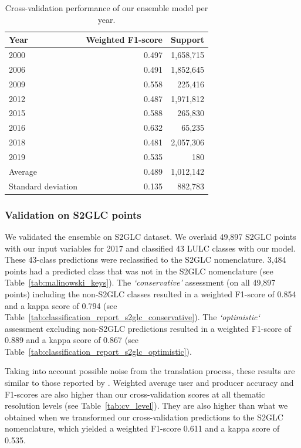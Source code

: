         \begin{table}[!hbt]
        \centering
        \caption{Cross-validation performance of our ensemble model per year.}
        \label{tab:cv_annual}
        \begin{tabular}{lrr}
        \toprule
        Year &  Weighted F1-score &  Support \\
        \midrule
        2000 &              0.497 &  1,658,715 \\
        2006 &              0.491 &  1,852,645 \\
        2009 &              0.558 &   225,416 \\
        2012 &              0.487 &  1,971,812 \\
        2015 &              0.588 &   265,830 \\
        2016 &              0.632 &    65,235 \\
        2018 &              0.481 &  2,057,306 \\
        2019 &              0.535 &      180 \\
        \midrule
        Average &              0.489 &  1,012,142 \\
        Standard deviation &              0.135 &   882,783 \\
        \bottomrule
        \end{tabular}
        \end{table}
    
        
    \subsubsection*{Validation on S2GLC points}
        \label{sec:results-s2glc}
        We validated the ensemble on S2GLC dataset.
        We overlaid 49,897 S2GLC points with our input variables for 2017 and classified 43 LULC classes with our model. These 43-class predictions were reclassified to the S2GLC nomenclature. 3,484 points had a predicted class that was not in the S2GLC nomenclature (see Table\@~\ref{tab:malinowski_keys}). The \emph{`conservative'} assessment (on all 49,897 points) including the non-S2GLC classes resulted in a weighted F1-score of 0.854 and a kappa score of 0.794 (see Table\@~\ref{tab:classification_report_s2glc_conservative}). The \emph{`optimistic`} assessment excluding non-S2GLC predictions resulted in a weighted F1-score of 0.889 and a kappa score of 0.867 (see Table\@~\ref{tab:classification_report_s2glc_optimistic}). 

        Taking into account possible noise from the translation process, these results are similar to those reported by \citet{malinowski2020}. Weighted average user and producer accuracy and F1-scores are also higher than our cross-validation scores at all thematic resolution levels (see Table\@~\ref{tab:cv_level}). They are also higher than what we obtained when we transformed our cross-validation predictions to the S2GLC nomenclature, which yielded a weighted F1-score 0.611 and a kappa score of 0.535.
        
